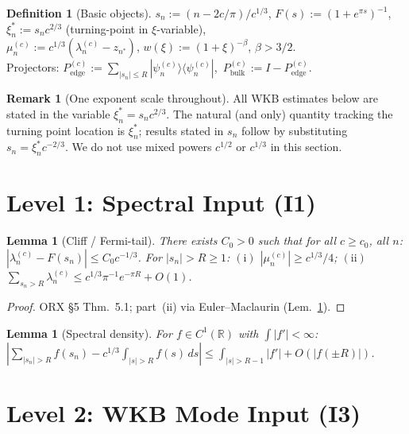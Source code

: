 \documentclass[12pt,a4paper]{amsart}
\newtheorem{lemma}[theorem]{Lemma}
\theoremstyle{definition}
\newtheorem{definition}[theorem]{Definition}
\newcommand{\ldef}{:=}
\newtheorem{remark}[theorem]{Remark}
\newcommand{\lam}[2]{\lambda_{#2}^{(#1)}}
\newcommand{\R}{\mathbb{R}}
\newcommand{\Sbulk}{P_{\mathrm{bulk}}^{(c)}}
\newcommand{\Sedge}{P_{\mathrm{edge}}^{(c)}}
\newcommand{\xin}{\xi_n^*}
\begin{document}
\begin{definition}[Basic objects]
\label{def:basic}
$s_n \ldef (n-2c/\pi)/c^{1/3}$,\quad
$F(s) \ldef (1+e^{\pi s})^{-1}$,\quad
$\xin \ldef s_n c^{2/3}$ (turning-point in $\xi$-variable),\\
$\mu_n^{(c)} \ldef c^{1/3}(\lam{c}{n}-z_{n^*})$,\quad
$w(\xi) \ldef (1+\xi)^{-\beta}$, $\beta>3/2$.\\
Projectors: $\Sedge \ldef \sum_{|s_n|\leq R}|\psi_n^{(c)}\rangle\langle\psi_n^{(c)}|$,\ 
$\Sbulk \ldef I-\Sedge$.
\end{definition}

\begin{remark}[One exponent scale throughout]
\label{rem:onescale}
All WKB estimates below are stated in the variable $\xin = s_n c^{2/3}$.
The natural (and only) quantity tracking the turning point location is
$\xin$; results stated in $s_n$ follow by substituting $s_n = \xin c^{-2/3}$.
We do not use mixed powers $c^{1/2}$ or $c^{1/3}$ in this section.
\end{remark}

\section{Level 1: Spectral Input (I1)}
\label{sec:cliff}

\begin{lemma}[Cliff / Fermi-tail]
\label{lem:cliff}
There exists $C_0>0$ such that for all $c\geq c_0$, all $n$:
$|\lam{c}{n}-F(s_n)|\leq C_0 c^{-1/3}$.
For $|s_n|>R\geq 1$:
$(\mathrm{i})$\; $|\mu_n^{(c)}|\geq c^{1/3}/4$;\quad
$(\mathrm{ii})$\; $\sum_{s_n>R}\lam{c}{n}\leq c^{1/3}\pi^{-1}e^{-\pi R}+O(1)$.
\end{lemma}

\begin{proof}
ORX \cite{Osipov2013} \S5 Thm.~5.1;
part~(ii) via Euler--Maclaurin (Lem.~\ref{lem:density}).
\end{proof}

\begin{lemma}[Spectral density]
\label{lem:density}
For $f\in C^1(\R)$ with $\int|f'|<\infty$:
$|\sum_{|s_n|>R}f(s_n) - c^{1/3}\int_{|s|>R}f(s)\,ds|
\leq \int_{|s|>R-1}|f'|+O(|f(\pm R)|)$.
\end{lemma}

\section{Level 2: WKB Mode Input (I3)}
\label{sec:wkb}
\end{document}

